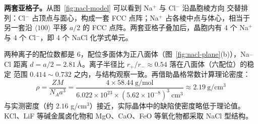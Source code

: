 \textbf{两套亚格子。}从图~\ref{fig:nacl-model} 可以看到 Na$^+$ 与 Cl$^-$ 沿晶胞棱方向
交替排列：Cl$^-$ 占顶点与面心，构成一套 FCC 点阵；Na$^+$ 占各棱中点与体心，相当于
另一套沿 $\langle100\rangle$ 平移 $a/2$ 的 FCC 点阵。两套亚格子叠加后，晶胞内有
4 个 Na$^+$ 与 4 个 Cl$^-$，即 4 个 NaCl 化学式单元。

两种离子的配位数都是 6，配位多面体为正八面体（图~\ref{fig:nacl-plane}(b)），Na--Cl
距离 $d=a/2=2.81$\,\AA。离子半径比 $r_+/r_-\approx0.54$ 落在八面体（六配位）的稳定
范围 $0.414\sim0.732$ 之内，与结构观察一致。再借助晶格常数计算理论密度：
\begin{equation}
  \rho=\frac{ZM}{N_Aa^3}
    =\frac{4\times58.44\ \mathrm{g/mol}}{6.022\times10^{23}\times
      (5.62\times10^{-8})^3\ \mathrm{cm^3}}
    \approx2.19\ \mathrm{g/cm^3}
\end{equation}
与实测密度（约 $2.16$ g/cm$^3$）接近，实际晶体中的缺陷使密度略低于理论值。KCl、LiF
等碱金属卤化物和 MgO、CaO、FeO 等氧化物都采取 NaCl 型结构。
